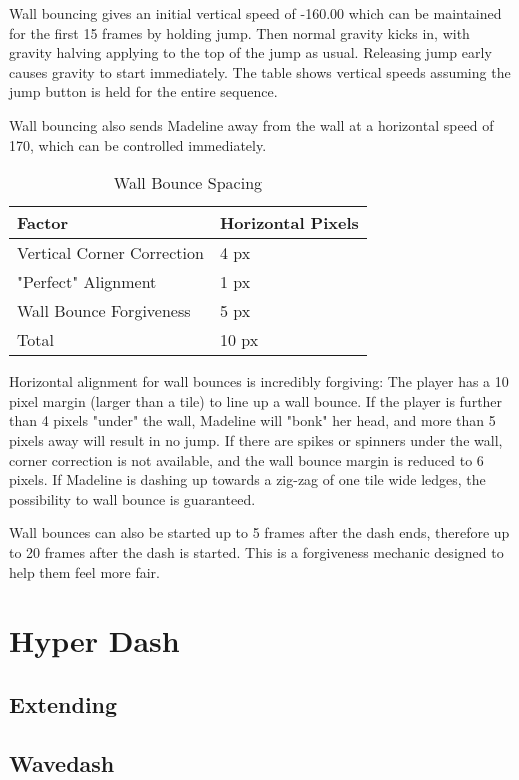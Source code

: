 \documentclass[oneside]{book}
\begin{document}
Wall bouncing gives an initial vertical speed of -160.00 which can be maintained for the first 15 frames by holding jump. Then normal gravity kicks in, with gravity halving applying to the top of the jump as usual. Releasing jump early causes gravity to start immediately. The table shows vertical speeds assuming the jump button is held for the entire sequence.

Wall bouncing also sends Madeline away from the wall at a horizontal speed of 170, which can be controlled immediately.

\begin{table}[h]
\begin{tabular}{|l|l|}
\hline
Factor&Horizontal Pixels\\
\hline
Vertical Corner Correction&4 px\\
\hline
"Perfect" Alignment&1 px\\
\hline
Wall Bounce Forgiveness&5 px\\
\hline
Total& 10 px\\
\hline
\end{tabular}
\caption{Wall Bounce Spacing}
\end{table}

Horizontal alignment for wall bounces is incredibly forgiving: The player has a 10 pixel margin (larger than a tile) to line up a wall bounce. If the player is further than 4 pixels "under" the wall, Madeline will "bonk" her head, and more than 5 pixels away will result in no jump. If there are spikes or spinners under the wall, corner correction is not available, and the wall bounce margin is reduced to 6 pixels. If Madeline is dashing up towards a zig-zag of one tile wide ledges, the possibility to wall bounce is guaranteed.

Wall bounces can also be started up to 5 frames after the dash ends, therefore up to 20 frames after the dash is started. This is a forgiveness mechanic designed to help them feel more fair.

\section{Hyper Dash}

\subsection{Extending}

\subsection{Wavedash}
\end{document}
